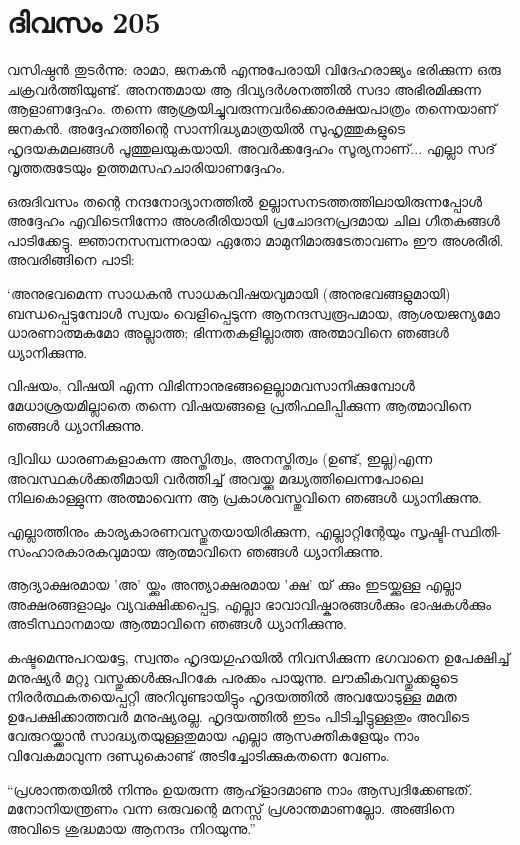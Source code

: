 \section{ദിവസം 205}


വസിഷ്ഠൻ തുടർന്നു: രാമാ, ജനകൻ എന്നുപേരായി വിദേഹരാജ്യം ഭരിക്കുന്ന ഒരു ചക്രവർത്തിയുണ്ട്. അനന്തമായ ആ ദിവ്യദർശനത്തില്‍ സദാ അഭിരമിക്കുന്ന ആളാണദ്ദേഹം. തന്നെ ആശ്രയിച്ചുവരുന്നവർക്കൊരക്ഷയപാത്രം തന്നെയാണ് ജനകന്‍. അദ്ദേഹത്തിന്റെ സാന്നിദ്ധ്യമാത്രയിൽ സുഹൃത്തുകളുടെ ഹൃദയകമലങ്ങൾ പൂത്തുലയുകയായി. അവർക്കദ്ദേഹം സൂര്യനാണ്‌... എല്ലാ സദ് വൃത്തരുടേയും ഉത്തമസഹചാരിയാണദ്ദേഹം.

ഒരുദിവസം തന്റെ നന്ദനോദ്യാനത്തിൽ ഉല്ലാസനടത്തത്തിലായിരുന്നപ്പോള്‍ അദ്ദേഹം എവിടെനിന്നോ അശരീരിയായി പ്രചോദനപ്രദമായ ചില ഗീതകങ്ങള്‍ പാടിക്കേട്ടു. ജ്ഞാനസമ്പന്നരായ ഏതോ മാമുനിമാരുടേതാവണം ഈ അശരീരി. അവരിങ്ങിനെ പാടി:

‘അനുഭവമെന്ന സാധകൻ സാധകവിഷയവുമായി (അനുഭവങ്ങളുമായി) ബന്ധപ്പെടുമ്പോൾ സ്വയം വെളിപ്പെടുന്ന ആനന്ദസ്വരൂപമായ, ആശയജന്യമോ ധാരണാത്മകമോ അല്ലാത്ത; ഭിന്നതകളില്ലാത്ത അത്മാവിനെ ഞങ്ങൾ ധ്യാനിക്കുന്നു.

വിഷയം, വിഷയി എന്ന വിഭിന്നാനുഭങ്ങളെല്ലാമവസാനിക്കുമ്പോൾ മേധാശ്രയമില്ലാതെ തന്നെ വിഷയങ്ങളെ പ്രതിഫലിപ്പിക്കുന്ന ആത്മാവിനെ ഞങ്ങൾ ധ്യാനിക്കുന്നു.

ദ്വിവിധ ധാരണകളാകുന്ന അസ്തിത്വം, അനസ്തിത്വം (ഉണ്ട്, ഇല്ല)എന്ന അവസ്ഥകൾക്കതീമായി വർത്തിച്ച് അവയ്ക്കു മദ്ധ്യത്തിലെന്നപോലെ നിലകൊള്ളുന്ന അത്മാവെന്ന ആ പ്രകാശവസ്തുവിനെ ഞങ്ങൾ ധ്യാനിക്കുന്നു.

എല്ലാത്തിനും കാര്യകാരണവസ്തുതയായിരിക്കുന്ന, എല്ലാറ്റിന്റേയും സൃഷ്ടി-സ്ഥിതി-സംഹാരകാരകവുമായ ആത്മാവിനെ ഞങ്ങൾ ധ്യാനിക്കുന്നു.

ആദ്യാക്ഷരമായ 'അ' യ്ക്കും അന്ത്യാക്ഷരമായ 'ക്ഷ' യ് ക്കും ഇടയ്ക്കുള്ള എല്ലാ അക്ഷരങ്ങളാലും വ്യവക്ഷിക്കപ്പെട്ട, എല്ലാ ഭാവാവിഷ്കാരങ്ങൾക്കും ഭാഷകൾക്കും അടിസ്ഥാനമായ ആത്മാവിനെ ഞങ്ങൾ ധ്യാനിക്കുന്നു.

കഷ്ടമെന്നുപറയട്ടേ, സ്വന്തം ഹൃദയഗുഹയിൽ നിവസിക്കുന്ന ഭഗവാനെ ഉപേക്ഷിച്ച് മനുഷ്യർ മറ്റു വസ്തുക്കൾക്കുപിറകേ പരക്കം പായുന്നു. ലൗകീകവസ്തുക്കളുടെ നിരർത്ഥകതയെപ്പറ്റി അറിവുണ്ടായിട്ടും ഹൃദയത്തിൽ അവയോടുള്ള മമത ഉപേക്ഷിക്കാത്തവർ മനുഷ്യരല്ല. ഹൃദയത്തിൽ ഇടം  പിടിച്ചിട്ടുള്ളതും അവിടെ വേരുറയ്ക്കാൻ സാദ്ധ്യതയുള്ളതുമായ എല്ലാ ആസക്തികളേയും നാം വിവേകമാവുന്ന ദണ്ഡുകൊണ്ട് അടിച്ചോടിക്കുകതന്നെ വേണം.

“പ്രശാന്തതയിൽ നിന്നും ഉയരുന്ന ആഹ്ളാദമാണു നാം ആസ്വദിക്കേണ്ടത്. മനോനിയന്ത്രണം വന്ന ഒരുവന്റെ മനസ്സ് പ്രശാന്തമാണല്ലോ. അങ്ങിനെ അവിടെ ശുദ്ധമായ ആനന്ദം നിറയുന്നു.” 

